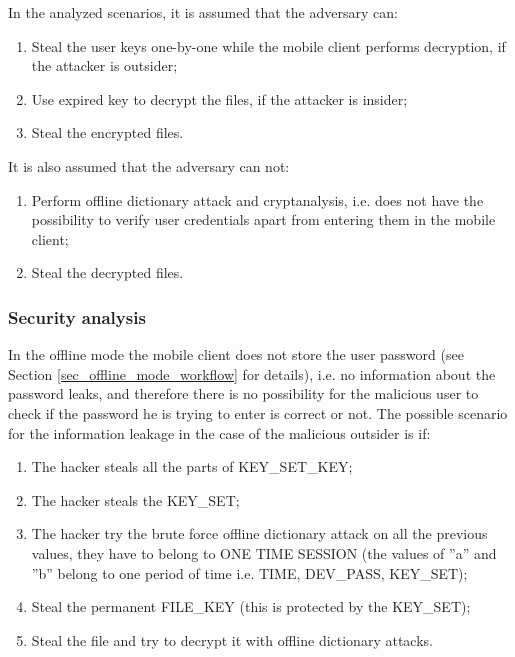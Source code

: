 \documentclass[twocolumn]{svjour3}          	%
\begin{document}
In the analyzed scenarios, it is assumed that the adversary can:

\begin{enumerate}
	\item Steal the user keys one-by-one while the mobile client performs decryption, if the attacker is outsider;
	\item Use expired key to decrypt the files, if the attacker is insider;
	\item Steal the encrypted files.
\end{enumerate}

It is also assumed that the adversary can not:

\begin{enumerate}
	\item Perform offline dictionary attack and cryptanalysis, i.e. does not have the possibility to verify user credentials apart from entering them in the mobile client;
	\item Steal the decrypted files.
\end{enumerate}

\subsubsection{Security analysis}
\label{sec_sec_analysis}

In the offline mode the mobile client does not store the user password (see Section \ref{sec_offline_mode_workflow} for details), i.e. no information about the password leaks, and therefore there is no possibility for the malicious user to check if the password he is trying to enter is correct or not. The possible scenario for the information leakage in the case of the malicious outsider is if:

\begin{enumerate}[label=(\alph*)]
	\item The hacker steals all the parts of KEY\_SET\_KEY;
	\item The hacker steals the KEY\_SET;
	\item The hacker try the brute force offline dictionary attack on all the previous values, they have to belong to ONE TIME SESSION (the values of ”a” and ”b” belong to one period of time i.e. TIME, DEV\_PASS, KEY\_SET);
	\item Steal the permanent FILE\_KEY (this is protected by the KEY\_SET);
	\item Steal the file and try to decrypt it with offline dictionary attacks.
\end{enumerate}
\end{document}
